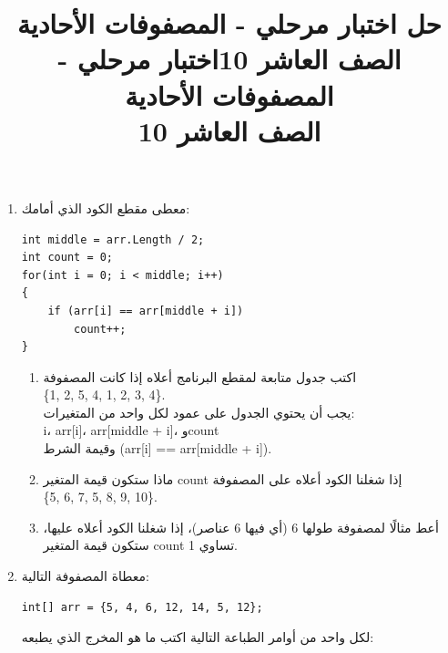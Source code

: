 \documentclass[14pt]{extarticle}
\title{حل اختبار مرحلي - المصفوفات الأحادية \\ الصف العاشر 10}
\title{اختبار مرحلي - المصفوفات الأحادية \\ الصف العاشر 10}
\begin{document}
\maketitle
\thispagestyle{fancy}

\begin{enumerate}[itemsep=3em]

    \item
    معطى مقطع الكود الذي أمامك:
    \begin{boxCode}
    \begin{english}
    \begin{verbatim}
int middle = arr.Length / 2;
int count = 0;
for(int i = 0; i < middle; i++)
{
    if (arr[i] == arr[middle + i])
        count++;
}
    \end{verbatim}
    \end{english}
    \end{boxCode}

    \begin{enumerate}[label=(\alph*)]
        \item اكتب جدول متابعة لمقطع البرنامج أعلاه إذا كانت المصفوفة \\
        \textenglish{\{1, 2, 5, 4, 1, 2, 3, 4\}}. \\
        يجب أن يحتوي الجدول على عمود لكل واحد من المتغيرات: \\
         \textenglish{i}، \textenglish{arr[i]}، \textenglish{arr[middle + i]}، و\textenglish{count} \\
         وقيمة الشرط \textenglish{(arr[i] == arr[middle + i])}.
        \item ماذا ستكون قيمة المتغير \textenglish{count} إذا شغلنا الكود أعلاه على المصفوفة \\
        \textenglish{\{5, 6, 7, 5, 8, 9, 10\}}.
        \item أعط مثالًا لمصفوفة طولها 6 (أي فيها 6 عناصر)، إذا شغلنا الكود أعلاه عليها، ستكون قيمة المتغير \textenglish{count} تساوي 1.
    \end{enumerate}

    \clearpage

        \item
    معطاة المصفوفة التالية:
    \begin{english}
    \begin{verbatim}
int[] arr = {5, 4, 6, 12, 14, 5, 12};
    \end{verbatim}
    \end{english}

    لكل واحد من أوامر الطباعة التالية اكتب ما هو المخرج الذي يطبعه:


\end{enumerate}
\end{document}
